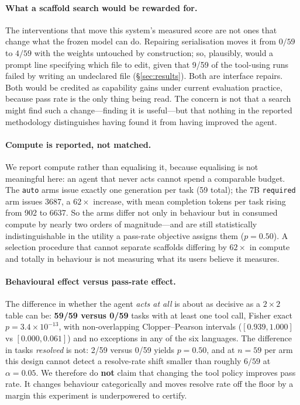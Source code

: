 \documentclass{article}
\begin{document}
\paragraph{What a scaffold search would be rewarded for.}
The interventions that move this system's measured score are not ones that
change what the frozen model can do. Repairing serialisation moves it from
$0/59$ to $4/59$ with the weights untouched by construction; so, plausibly,
would a prompt line specifying which file to edit, given that 9/59 of the
tool-using runs failed by writing an undeclared file
(\S\ref{sec:results}). Both are interface repairs. Both would be credited as
capability gains under current evaluation practice, because pass rate is
the only thing being read. The concern is not that a search might find such
a change---finding it is useful---but that nothing in the reported
methodology distinguishes having found it from having improved the agent.

\paragraph{Compute is reported, not matched.}
We report compute rather than equalising it, because equalising is not
meaningful here: an agent that never acts cannot spend a comparable budget.
The \texttt{auto} arms issue exactly one generation per task (59 total); the
7B \texttt{required} arm issues 3687, a $62\times$ increase, with mean
completion tokens per task rising from 902 to 6637. So the arms differ not
only in behaviour but in consumed compute by nearly two orders of
magnitude---and are still statistically indistinguishable in the utility a
pass-rate objective assigns them ($p = 0.50$). A selection procedure that
cannot separate scaffolds differing by $62\times$ in compute and totally in
behaviour is not measuring what its users believe it measures.

\paragraph{Behavioural effect versus pass-rate effect.}
The difference in
whether the agent \emph{acts at all} is about as decisive as a $2\times2$ table
can be: \textbf{59/59 versus 0/59} tasks with at least one tool call, Fisher
exact $p = 3.4\times10^{-13}$, with non-overlapping Clopper--Pearson intervals
($[0.939, 1.000]$ vs $[0.000, 0.061]$) and no exceptions in any of the six
languages. The difference in tasks \emph{resolved} is not: 2/59 versus 0/59
yields $p = 0.50$, and at $n = 59$ per arm this design cannot detect a
resolve-rate shift smaller than roughly $6/59$ at $\alpha = 0.05$. We therefore
do \textbf{not} claim that changing the tool policy improves pass rate. It
changes behaviour categorically and moves resolve rate off the floor by a
margin this experiment is underpowered to certify.
\end{document}

